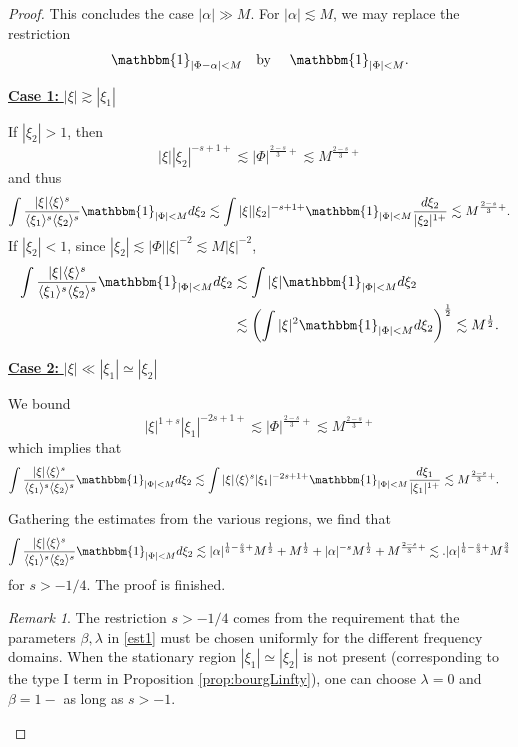 \documentclass[%
11pt,  reqno]{amsart}
\newcommand{\fia}{\mathbbm{1}_{|\Phi-\alpha|<M}}
\newcommand{\jap}[1]{\langle #1 \rangle}
\newcommand{\5}{\textup{V}}
\newcommand{\noi}{\noindent}
\newcommand{\les}{\lesssim}
\theoremstyle{remark}
\newtheorem{remark}[theorem]{Remark}
\numberwithin{equation}{section}
\numberwithin{theorem}{section}
\begin{document}
\begin{proof}
\smallskip

This concludes the case $|\alpha|\gg M$. For $|\alpha|\lesssim M$, we may replace the restriction
$$
\fia \quad \mbox{by }\quad \mathbbm{1}_{|\Phi|<M}.
$$

\smallskip 
\noi
\underline{\textbf{Case 1:} $|\xi|\gtrsim |\xi_1|$} 

If $|\xi_2|>1$, then
$$
|\xi||\xi_2|^{-s+1+}\lesssim |\Phi|^{\frac{2-s}{3}+} \lesssim M^{\frac{2-s}{3}+}
$$
and thus
\begin{align}
\int \frac{|\xi|\jap{\xi}^s}{\jap{\xi_1}^s\jap{\xi_2}^s}\mathbbm{1}_{|\Phi|<M} d\xi_2 \les \int |\xi||\xi_2|^{-s+1+}\mathbbm{1}_{|\Phi|<M}\frac{d\xi_2}{|\xi_2|^{1+}}\lesssim M^{\frac{2-s}{3}+}.
\end{align}
If $|\xi_2|<1$, since $|\xi_2|\lesssim |\Phi||\xi|^{-2}\lesssim M|\xi|^{-2}$,
\begin{align}
\int \frac{|\xi|\jap{\xi}^s}{\jap{\xi_1}^s\jap{\xi_2}^s}\mathbbm{1}_{|\Phi|<M} d\xi_2 &\les \int |\xi|\mathbbm{1}_{|\Phi|<M}d\xi_2\\&\lesssim \left(\int |\xi|^2\mathbbm{1}_{|\Phi|<M} d\xi_2\right)^\frac12\lesssim M^{\frac12}.
\end{align}


\smallskip\noi
\underline{\textbf{Case 2:} $|\xi|\ll |\xi_1|\simeq |\xi_2|$} 

We bound
\begin{equation}\label{eq:estbm1}
    |\xi|^{1+s}|\xi_1|^{-2s+1+}\lesssim |\Phi|^{\frac{2-s}{3}+}\lesssim M^{\frac{2-s}{3}+}
\end{equation}
which implies that
\begin{align}
\int \frac{|\xi|\jap{\xi}^s}{\jap{\xi_1}^s\jap{\xi_2}^s}\mathbbm{1}_{|\Phi|<M} d\xi_2 &\les \int |\xi|\jap{\xi}^s|\xi_1|^{-2s+1+}\mathbbm{1}_{|\Phi|<M}\frac{d\xi_1}{|\xi_1|^{1+}}\lesssim  M^{\frac{2-s}{3}+}.
\end{align}

\medskip

Gathering the estimates from the various regions, we find that
\begin{align}
\int \frac{|\xi|\jap{\xi}^s}{\jap{\xi_1}^s\jap{\xi_2}^s}\mathbbm{1}_{|\Phi|<M} d\xi_2 \lesssim |\alpha|^{\frac16-\frac s3+}M^{\frac12} + M^{\frac12} + |\alpha|^{-s}M^{\frac12} +  M^{\frac{2-s}{3}+} \lesssim .|\alpha|^{\frac16-\frac s3+}M^{\frac34}
\end{align}
for $s>-1/4$. The proof is finished.

\begin{remark}
    The restriction $s>-1/4$ comes from the requirement that the parameters $\beta,\lambda$ in \eqref{est1} must be chosen uniformly for the different frequency domains. When the stationary region $|\xi_1|\simeq |\xi_2|$ is not present (corresponding to the type I term in Proposition \ref{prop:bourgLinfty}), one can choose $\lambda=0$ and $\beta=1-$ as long as $s>-1$.


\end{remark}
\end{proof}
\end{document}
